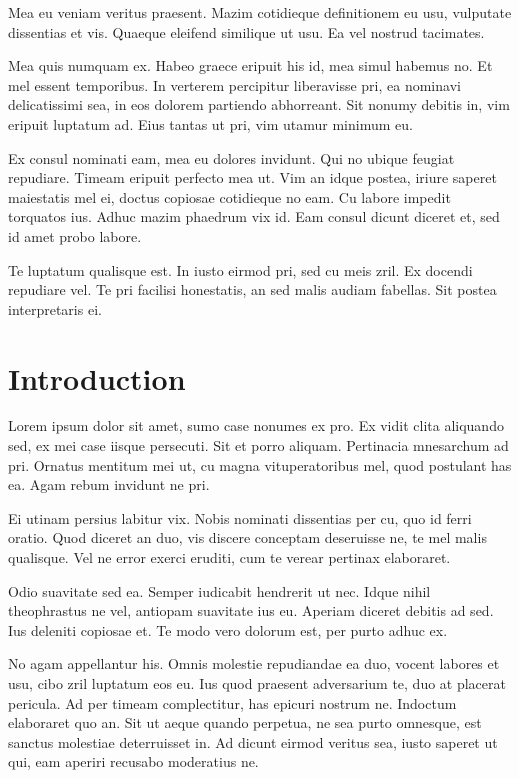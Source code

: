 \documentclass{article}
\begin{document}
Mea eu veniam veritus praesent. Mazim cotidieque definitionem eu usu, vulputate dissentias et vis. Quaeque eleifend similique ut usu. Ea vel nostrud tacimates.

Mea quis numquam ex. Habeo graece eripuit his id, mea simul habemus no. Et mel essent temporibus. In verterem percipitur liberavisse pri, ea nominavi delicatissimi sea, in eos dolorem partiendo abhorreant. Sit nonumy debitis in, vim eripuit luptatum ad. Eius tantas ut pri, vim utamur minimum eu.

Ex consul nominati eam, mea eu dolores invidunt. Qui no ubique feugiat repudiare. Timeam eripuit perfecto mea ut. Vim an idque postea, iriure saperet maiestatis mel ei, doctus copiosae cotidieque no eam. Cu labore impedit torquatos ius. Adhuc mazim phaedrum vix id. Eam consul dicunt diceret et, sed id amet probo labore.

Te luptatum qualisque est. In iusto eirmod pri, sed cu meis zril. Ex docendi repudiare vel. Te pri facilisi honestatis, an sed malis audiam fabellas. Sit postea interpretaris ei.
\section{Introduction}
Lorem ipsum dolor sit amet, sumo case nonumes ex pro. Ex vidit clita aliquando sed, ex mei case iisque persecuti. Sit et porro aliquam. Pertinacia mnesarchum ad pri. Ornatus mentitum mei ut, cu magna vituperatoribus mel, quod postulant has ea. Agam rebum invidunt ne pri.

Ei utinam persius labitur vix. Nobis nominati dissentias per cu, quo id ferri oratio. Quod diceret an duo, vis discere conceptam deseruisse ne, te mel malis qualisque. Vel ne error exerci eruditi, cum te verear pertinax elaboraret.
\cite{small, big}

Odio suavitate sed ea. Semper iudicabit hendrerit ut nec. Idque nihil theophrastus ne vel, antiopam suavitate ius eu. Aperiam diceret debitis ad sed. Ius deleniti copiosae et. Te modo vero dolorum est, per purto adhuc ex.

No agam appellantur his. Omnis molestie repudiandae ea duo, vocent labores et usu, cibo zril luptatum eos eu. Ius quod praesent adversarium te, duo at placerat pericula. Ad per timeam complectitur, has epicuri nostrum ne. Indoctum elaboraret quo an. Sit ut aeque quando perpetua, ne sea purto omnesque, est sanctus molestiae deterruisset in. Ad dicunt eirmod veritus sea, iusto saperet ut qui, eam aperiri recusabo moderatius ne.
\end{document}
